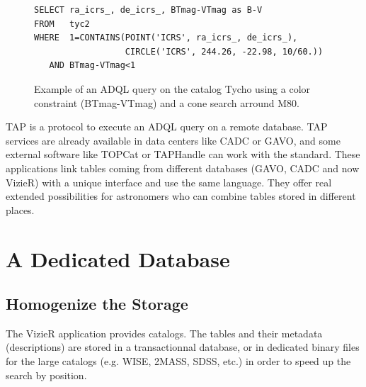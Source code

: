\begin{figure}[!h] \center
\begin{footnotesize}
\begin{verbatim}
SELECT ra_icrs_, de_icrs_, BTmag-VTmag as B-V
FROM   tyc2
WHERE  1=CONTAINS(POINT('ICRS', ra_icrs_, de_icrs_),
                  CIRCLE('ICRS', 244.26, -22.98, 10/60.))
   AND BTmag-VTmag<1
\end{verbatim}\end{footnotesize}
\caption{Example of an ADQL query on the catalog Tycho using a color constraint (BTmag-VTmag) and a cone search arround M80.}\label{P044:ADQLexample}
\end{figure}

TAP \citep{tap_2011} is a protocol to execute an ADQL query on a remote database. TAP services are already available in data centers like CADC or GAVO, and some external software like TOPCat or TAPHandle can work with the standard. These applications link tables coming from different databases (GAVO, CADC and now VizieR) with a unique interface and use the same language. They offer real extended possibilities for astronomers who can combine tables stored in different places.


\section{A Dedicated Database}

\subsection{Homogenize the Storage}
The VizieR application provides catalogs. The tables and their metadata (descriptions) are stored in a transactionnal database, or in dedicated binary files for the large catalogs (e.g. WISE, 2MASS, SDSS, etc.) in order to speed up the search by position.

